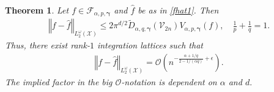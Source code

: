 \documentclass[article]{siamltex}
\newtheorem{Theorem}{Theorem}
\def\bgam{{\boldsymbol \gamma }}
\def\calV {\mathcal {V}}
\def\calF {\mathcal {F}}
\newcommand{\norm}[1]{\left\Vert#1\right\Vert}
\begin{document}
\vskip5mm   \begin{Theorem}\label{C4err} Let $f \in
{\calF}_{\alpha,p,\bgam}$ and $\hat{f}$ be as in \eqref{fhat1}.
Then
\begin{eqnarray}
 \norm{f-\hat{f}}_{L_2^{\omega}(\mathcal X)} \leq 2\pi^{d/2}\widetilde{D}_{\alpha ,q,\bgam}(\calV_{2n})
  V_{\alpha,p,\bgam}(f),\quad \frac{1}{p}+\frac{1}{q}=1.\end{eqnarray}Thus, there exist rank-$1$
integration lattices such that
\begin{eqnarray}\label{eqn:C4err}
 \norm{f-\hat{f}}_{L_2^{\omega}(\mathcal X)}=\mathcal{O}\left( n^{-\frac{\alpha+ 1/q}{2-1/(\alpha q)}+\epsilon}\right).
\end{eqnarray}
The implied factor in the big $\mathcal{O}$-notation is dependent
on $\alpha$ and $d.$
\end{Theorem}
\end{document}
